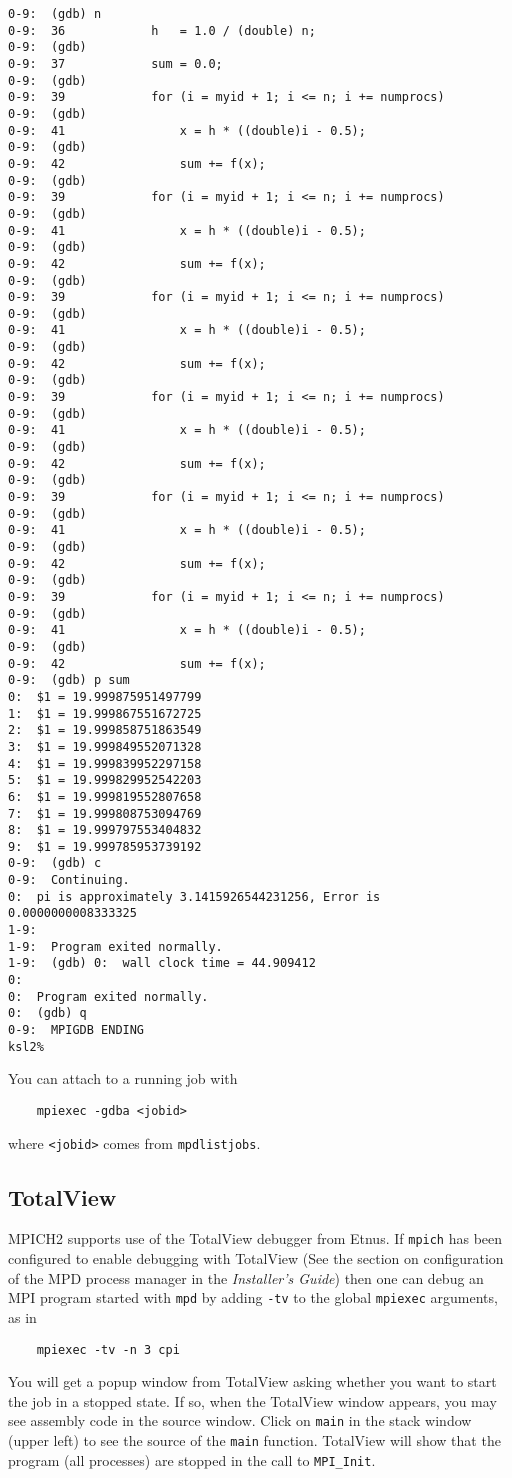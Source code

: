 \documentclass[dvipdfm,11pt]{article}
\begin{document}
\begin{small}
\begin{verbatim}
0-9:  (gdb) n
0-9:  36            h   = 1.0 / (double) n;
0-9:  (gdb) 
0-9:  37            sum = 0.0;
0-9:  (gdb) 
0-9:  39            for (i = myid + 1; i <= n; i += numprocs)
0-9:  (gdb) 
0-9:  41                x = h * ((double)i - 0.5);
0-9:  (gdb) 
0-9:  42                sum += f(x);
0-9:  (gdb) 
0-9:  39            for (i = myid + 1; i <= n; i += numprocs)
0-9:  (gdb) 
0-9:  41                x = h * ((double)i - 0.5);
0-9:  (gdb) 
0-9:  42                sum += f(x);
0-9:  (gdb) 
0-9:  39            for (i = myid + 1; i <= n; i += numprocs)
0-9:  (gdb) 
0-9:  41                x = h * ((double)i - 0.5);
0-9:  (gdb) 
0-9:  42                sum += f(x);
0-9:  (gdb) 
0-9:  39            for (i = myid + 1; i <= n; i += numprocs)
0-9:  (gdb) 
0-9:  41                x = h * ((double)i - 0.5);
0-9:  (gdb) 
0-9:  42                sum += f(x);
0-9:  (gdb) 
0-9:  39            for (i = myid + 1; i <= n; i += numprocs)
0-9:  (gdb) 
0-9:  41                x = h * ((double)i - 0.5);
0-9:  (gdb) 
0-9:  42                sum += f(x);
0-9:  (gdb) 
0-9:  39            for (i = myid + 1; i <= n; i += numprocs)
0-9:  (gdb) 
0-9:  41                x = h * ((double)i - 0.5);
0-9:  (gdb) 
0-9:  42                sum += f(x);
0-9:  (gdb) p sum
0:  $1 = 19.999875951497799
1:  $1 = 19.999867551672725
2:  $1 = 19.999858751863549
3:  $1 = 19.999849552071328
4:  $1 = 19.999839952297158
5:  $1 = 19.999829952542203
6:  $1 = 19.999819552807658
7:  $1 = 19.999808753094769
8:  $1 = 19.999797553404832
9:  $1 = 19.999785953739192
0-9:  (gdb) c
0-9:  Continuing.
0:  pi is approximately 3.1415926544231256, Error is 0.0000000008333325
1-9:  
1-9:  Program exited normally.
1-9:  (gdb) 0:  wall clock time = 44.909412
0:  
0:  Program exited normally.
0:  (gdb) q
0-9:  MPIGDB ENDING
ksl2% 
\end{verbatim}
\end{small}
You can attach to a running job with
\begin{verbatim}
    mpiexec -gdba <jobid>
\end{verbatim}
where \texttt{<jobid>} comes from \texttt{mpdlistjobs}.


\subsection{TotalView}
\label{sec:totalview}

MPICH2 supports use of the TotalView debugger from Etnus.  If
\texttt{mpich} has been configured to enable debugging with TotalView
(See the section on configuration of the MPD process manager in the
\emph{Installer's Guide}) then one can debug an MPI program started
with \texttt{mpd} by adding \texttt{-tv} to the global \texttt{mpiexec}
arguments, as in
\begin{verbatim}
    mpiexec -tv -n 3 cpi
\end{verbatim}
You will get a popup window from TotalView asking whether you want to
start the job in a stopped state.  If so,
when the TotalView window appears, you may see assembly code in the
source window.  Click on \texttt{main} in the stack window (upper left)
to see the source of the \texttt{main} function.  TotalView will show
that the program (all processes) are stopped in the call to
\texttt{MPI\_Init}. 
\end{document}
